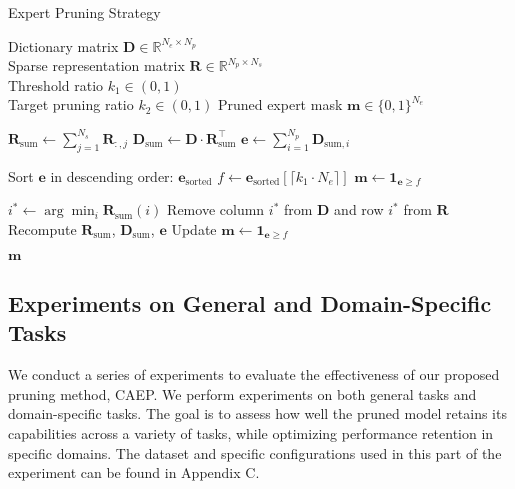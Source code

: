 \documentclass[11pt]{article}
\begin{document}

\begin{algorithm}[htbp]  
\small  
\caption{Expert Pruning Strategy}  
\label{alg:caep}  
\begin{algorithmic}[1]  
\Require   
    Dictionary matrix $\mathbf{D} \in \mathbb{R}^{N_e \times N_p}$ \\  
    Sparse representation matrix $\mathbf{R} \in \mathbb{R}^{N_p \times N_s}$ \\  
    Threshold ratio $k_1 \in (0,1)$ \\  
    Target pruning ratio $k_2 \in (0,1)$  
\Ensure Pruned expert mask $\mathbf{m} \in \{0,1\}^{N_e}$  


\State $\mathbf{R}_{\text{sum}} \gets \sum_{j=1}^{N_s} \mathbf{R}_{:,j}$   
\State $\mathbf{D}_{\text{sum}} \gets \mathbf{D} \cdot \mathbf{R}_{\text{sum}}^{\top}$   
\State $\mathbf{e} \gets \sum_{i=1}^{N_p} \mathbf{D}_{\text{sum},i}$   


\State Sort $\mathbf{e}$ in descending order: $\mathbf{e}_{\text{sorted}}$  
\State $f \gets \mathbf{e}_{\text{sorted}}[\lceil k_1 \cdot N_e \rceil]$   
\State $\mathbf{m} \gets \mathbf{1}_{\mathbf{e} \geq f}$   
 
    \State $i^* \gets \arg\min_{i} \mathbf{R}_{\text{sum}}(i)$   
    \State Remove column $i^*$ from $\mathbf{D}$ and row $i^*$ from $\mathbf{R}$  
    \State Recompute $\mathbf{R}_{\text{sum}}$, $\mathbf{D}_{\text{sum}}$, $\mathbf{e}$  
    \State Update $\mathbf{m} \gets \mathbf{1}_{\mathbf{e} \geq f}$   
\EndWhile  

\Return $\mathbf{m}$  
\end{algorithmic}  
\end{algorithm} 

\subsection{Experiments on General and Domain-Specific Tasks}
We conduct a series of experiments to evaluate the effectiveness of our proposed pruning method, CAEP. We perform experiments on both general tasks and domain-specific tasks. The goal is to assess how well the pruned model retains its capabilities across a variety of tasks, while optimizing performance retention in specific domains. 
The dataset and specific configurations used in this part of the experiment can be found in Appendix C.
\end{document}
